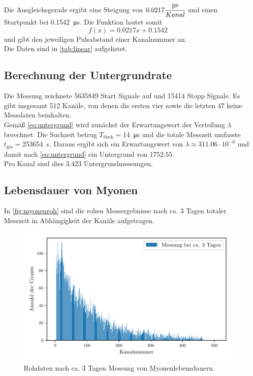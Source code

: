 Die Ausgleichsgerade ergibt eine Steigung von $0.0217\cfrac{\si{\micro\second}}{Kanal}$ und einen Startpunkt bei \SI{0.1542}{\micro\second}.
Die Funktion lautet somit
\begin{equation}
    f(x) = 0.0217x + 0.1542
\end{equation}
und gibt den jeweiligen Pulsabstand einer Kanalnummer an.\\
Die Daten sind in \autoref{tab:linear} aufgelistet.

\subsection{Berechnung der Untergrundrate}
Die Messung zeichnete 5635849 Start Signale auf und 15414 Stopp Signale.
Es gibt insgesamt 512 Kanäle, von denen die ersten vier sowie die letzten 47 keine Messdaten beinhalten.\\
Gemäß \autoref{eq:untergrund} wird zunächst der Erwartungswert der Verteilung $\lambda$ berechnet.
Die Suchzeit betrug $T_{\text{Such}} = $\SI{14}{\micro\second} und die totale Messzeit umfasste $t_{\text{ges}} = $\SI{253654}{\second}.
Daraus ergibt sich ein Erwartungswert von $\lambda \approx 311.06\cdot 10^{-6}$ und damit nach \autoref{eq:untergrund} ein Untergrund von $1752.55$.\\
Pro Kanal sind dies 3.423 Untergrundmessungen.

\subsection{Lebensdauer von Myonen}
In \autoref{fig:myonenroh} sind die rohen Messergebnisse nach ca. 3 Tagen totaler Messzeit in Abhängigkeit der Kanäle aufgetragen.

\begin{figure}[H]
    \centering
    \includegraphics{images/messung_roh.pdf}
    \caption{Rohdaten nach ca. 3 Tagen Messung von Myonenlebensdauern.}
    \label{fig:myonenroh}
\end{figure}

